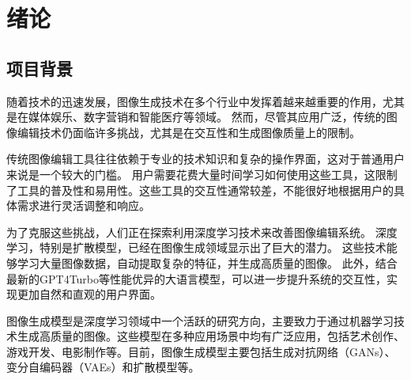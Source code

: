 \documentclass[a4paper,AutoFakeBold,oneside,12pt]{book}
\begin{document}
%   

%   

%   

%  


\frontmatter
\tableofcontents %

\newpage\mainmatter
{}



\chapter{绪论} %
\section{项目背景}
随着技术的迅速发展，图像生成技术在多个行业中发挥着越来越重要的作用，尤其是在媒体娱乐、数字营销和智能医疗等领域。
然而，尽管其应用广泛，传统的图像编辑技术仍面临许多挑战，尤其是在交互性和生成图像质量上的限制。

传统图像编辑工具往往依赖于专业的技术知识和复杂的操作界面，这对于普通用户来说是一个较大的门槛。
用户需要花费大量时间学习如何使用这些工具，这限制了工具的普及性和易用性。这些工具的交互性通常较差，不能很好地根据用户的具体需求进行灵活调整和响应。

为了克服这些挑战，人们正在探索利用深度学习技术来改善图像编辑系统。
深度学习，特别是扩散模型，已经在图像生成领域显示出了巨大的潜力。
这些技术能够学习大量图像数据，自动提取复杂的特征，并生成高质量的图像。
此外，结合最新的GPT4Turbo等性能优异的大语言模型，可以进一步提升系统的交互性，实现更加自然和直观的用户界面。

图像生成模型是深度学习领域中一个活跃的研究方向，主要致力于通过机器学习技术生成高质量的图像。这些模型在多种应用场景中均有广泛应用，包括艺术创作、游戏开发、电影制作等。目前，图像生成模型主要包括生成对抗网络（GANs）、变分自编码器（VAEs）和扩散模型等。
\end{document}
